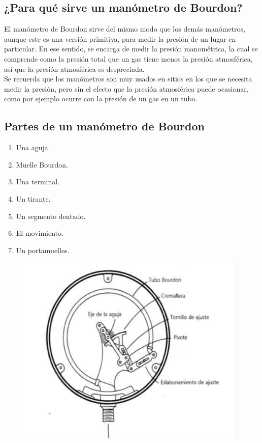 \documentclass[a4paper,12pt]{report}
\begin{document}
\subsection{¿Para qué sirve un manómetro de Bourdon?}
El manómetro de Bourdon sirve del mismo modo que los demás manómetros, aunque este es una versión primitiva, para medir la presión de un lugar en particular. En ese sentido, se encarga de medir la presión manométrica, la cual se comprende como la presión total que un gas tiene menos la presión atmosférica, así que la presión atmosférica es despreciada.\\
Se recuerda que los manómetros son muy usados en sitios en los que se necesita medir la presión, pero sin el efecto que la presión atmosférica puede ocasionar, como por ejemplo ocurre con la presión de un gas en un tubo.
\subsection{Partes de un manómetro de Bourdon}
\begin{enumerate}
\item Una aguja.
\item Muelle Bourdon.
\item Una terminal.
\item Un tirante.
\item Un segmento dentado.
\item El movimiento.
\item Un portamuelles.
\end{enumerate}
\begin{figure}[H]
\centering
\includegraphics[scale=0.55]{bourdon2.png}
\end{figure}
\end{document}
